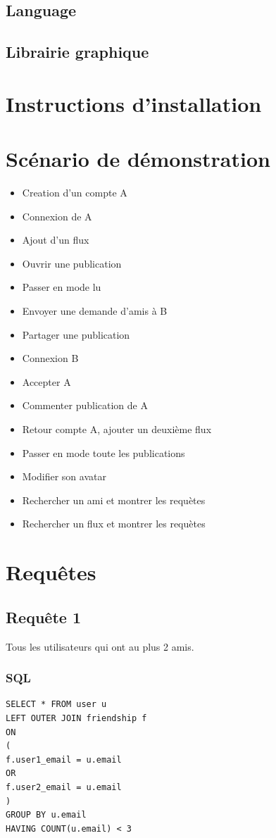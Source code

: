 \documentclass[a4paper,10pt]{article}
\begin{document}
\subsection{Language}
\subsection{Librairie graphique}
		
\section{Instructions d'installation}
		
\section{Scénario de démonstration}
\begin{itemize}
\item Creation d'un compte A
\item Connexion de A
\item Ajout d'un flux
\item Ouvrir une publication
\item Passer en mode lu
\item Envoyer une demande d'amis à B
\item Partager une publication
\item Connexion B
\item Accepter A
\item Commenter publication de A
\item Retour compte A, ajouter un deuxième flux
\item Passer en mode toute les publications
\item Modifier son avatar
\item Rechercher un ami et montrer les requètes
\item Rechercher un flux et montrer les requètes
\end{itemize}
		
\section{Requêtes}
\subsection{Requête 1}
Tous les utilisateurs qui ont au plus 2 amis.
\subsubsection{SQL}
\begin{lstlisting}
SELECT * FROM user u
LEFT OUTER JOIN friendship f
ON
(
f.user1_email = u.email
OR
f.user2_email = u.email
)
GROUP BY u.email
HAVING COUNT(u.email) < 3
\end{lstlisting}
\end{document}
